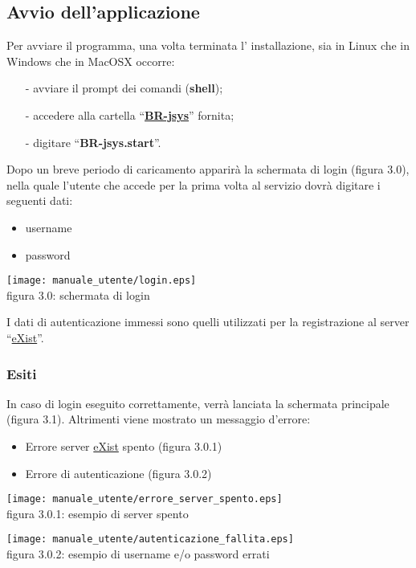 \subsection{Avvio dell'applicazione}
Per avviare il programma, una volta terminata l' installazione, sia in Linux che in Windows che in MacOSX occorre:
\begin{itemize}
\item[-] avviare il prompt dei comandi (\textbf{shell});
\item[-] accedere alla cartella ``\textbf{\underline{BR-jsys}}'' fornita; 
\item[-] digitare ``\textbf{BR-jsys.start}''.
\end{itemize}
 Dopo un breve periodo di caricamento apparir\`a la schermata di login (figura 3.0), nella quale l'utente che accede per la prima volta al servizio dovr\`a digitare i seguenti dati: 
\begin{itemize}
\item username
\item password
\end{itemize}
\begin{center}
\texttt{[image: manuale\_utente/login.eps]}\\
 figura 3.0: schermata di login
\end{center}
I dati di autenticazione immessi sono quelli utilizzati per la registrazione al server ``\underline{eXist}''.
\subsubsection{Esiti}
In caso di login eseguito correttamente, verr\`a lanciata la schermata principale (figura 3.1).
Altrimenti viene mostrato un messaggio d'errore:
\begin{itemize}
\item Errore server \underline{eXist} spento (figura 3.0.1)
\item Errore di autenticazione (figura 3.0.2)
\end{itemize}

\begin{center}
\texttt{[image: manuale\_utente/errore\_server\_spento.eps]}\\
 figura 3.0.1: esempio di server spento
\end{center} 

\begin{center}
\texttt{[image: manuale\_utente/autenticazione\_fallita.eps]}\\
figura 3.0.2: esempio di username e/o password errati
\end{center} 

